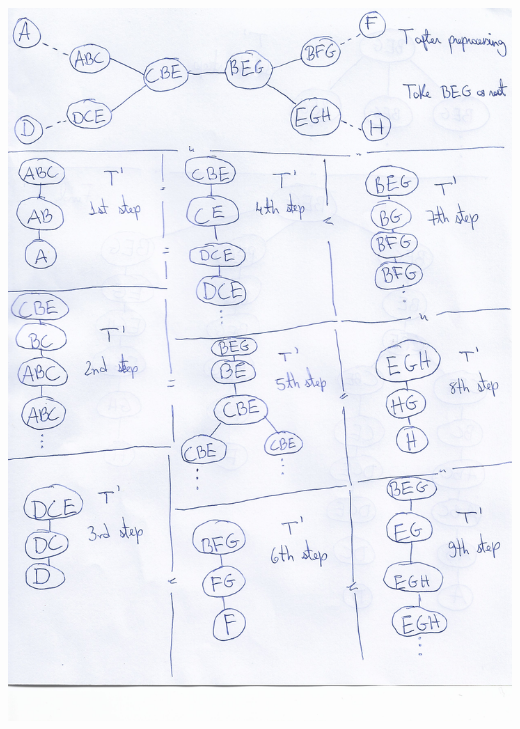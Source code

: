 \documentclass{article}
\begin{document}
\includegraphics[scale=0.7]{1st_demo_graph_hw3}
\end{document}
